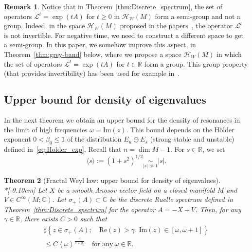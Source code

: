 \documentclass[10pt]{amsart}
\newtheorem{theo}{Theorem}[section]
\theoremstyle{definition}\newtheorem{defi}[theo]{Definition}\newtheorem{rema}[theo]{Remark}\newtheorem{exam}[theo]{Example}\newtheorem{exem}[theo]{Example}\newtheorem{nota}[theo]{Notation}
\newcommand{\clH}{\mathcal{H}}
\newcommand{\clL}{\mathcal{L}}
\newcommand{\Ree}{\mathrm{Re}}
\newcommand{\Imm}{\mathrm{Im}}
\newcommand{\bbR}{\mathbb{R}}
\newcommand{\bbC}{\mathbb{C}}
\begin{document}
\begin{rema}
Notice that in Theorem~\ref{thm:Discrete_spectrum}, the set of operators $\clL^{t}=\exp(tA)$ for $t\geq0$ in $\clH _{W}(M)$ form a semi-group and not a group. Indeed, in the space $\clH _{W}(M)$ proposed in the papers~\cite{liverani_butterley_07,fred_flow_09}, the operator $\clL^{t}$ is not invertible. For negative time, we need to construct a different space to get a semi-group. In this paper, we somehow improve this aspect, in Theorem~\ref{thm:grey-band} below, where we propose a space $\clH _{W}(M)$ in which the set of operators $\clL^{t}=\exp(tA)$ for $t\in\bbR$ form a group. This group property (that provides invertibility) has been used for example in~\cite{faure-tsujii_anosov_flows_16}.
\end{rema}


\subsection{Upper bound for density of eigenvalues}
In the next theorem we obtain an upper bound for the density of resonances in the limit of high frequencies $\omega=\Imm(z)$. This bound depends on the H\"older exponent $0<\beta_{0}\leq1$ of the distribution $E_{u}\oplus E_{s}$ (strong stable and unstable) defined in~\eqref{eq:Holder_exp}. Recall that $n=\dim M-1$. For $s\in\bbR$, we set
\begin{equation}\label{eq:def_Japonese_bracket}
\langle s\rangle:=\left(1+s^{2}\right)^{1/2}\underset{\left|s\right|\gg1}{\sim}\left|s\right|.
\end{equation}

\begin{tcolorbox}[enhanced, frame style={teal!80}, interior style={cyan!0},breakable]
\begin{theo}[Fractal Weyl law: upper bound for density of eigenvalues]\label{thm:Weyl law}\ \\*[-0.10em]
Let $X$ be a smooth Anosov vector field on a closed manifold $M$ and $V\in C^{\infty}(M;\bbC)$. Let $\sigma_{+}(A)\subset\bbC$ be the discrete Ruelle spectrum defined in Theorem~\ref{thm:Discrete_spectrum} for the operator $A=-X+V$. Then, for any $\gamma\in\bbR$, there exists $C>0$ such that
\begin{multline}\label{eq:weyl_upper_bound}
\sharp\left\{ z\in\sigma_{+}\left(A\right);\quad\Ree\left(z\right)>\gamma,\,\Imm\left(z\right)\in\left[\omega,\omega+1\right]\right\}\\ \leq C\left\langle \omega\right\rangle ^{\frac{n}{1+\beta_{0}}} \quad\text{for any}\:\omega\in\bbR.
\end{multline}
\end{theo}
\end{tcolorbox}
\end{document}
